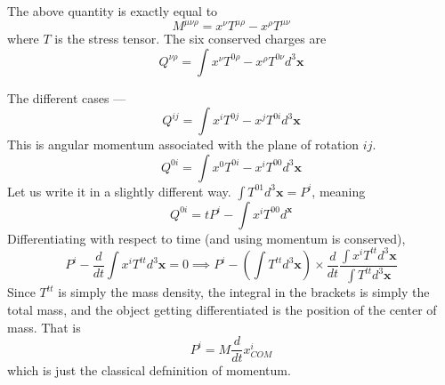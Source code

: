 \documentclass[11pt, notitlepage]{report}
\numberwithin{equation}{section}
\begin{document}
    The above quantity is exactly equal to 
    \begin{equation*}
        M^{\mu\nu\rho} = x^\nu T^{\mu\rho} - x^\rho T^{\mu\nu}
    \end{equation*}
    where \(T\) is the stress tensor. The six conserved charges are 
    \begin{equation*}
        Q^{\nu\rho} = \int  x^\nu T^{0\rho} - x^\rho T^{0\nu} d^3\textbf{x}
    \end{equation*}

    The different cases —\\
    \begin{equation*}
        Q^{ij} = \int  x^i T^{0j} - x^j T^{0i} d^3\textbf{x}
    \end{equation*}
    This is angular momentum associated with the plane of rotation \(ij\).
    \begin{equation*}
        Q^{0i} = \int  x^0 T^{0i} - x^i T^{00} d^3\textbf{x}
    \end{equation*}
    Let us write it in a slightly different way. \(\int T^{01} d^3\textbf{x} = P^i\), meaning 
    \begin{equation*}
        Q^{0i} = tP^i - \int x^i T^{00} d^\textbf{x}
    \end{equation*}
    Differentiating with respect to time (and using momentum is conserved),
    \begin{equation*}
        P^i - \frac{d}{dt} \int x^i T^{tt} d^3\textbf{x} = 0 \implies P^i - \left(\int  T^{tt}d^3\textbf{x} \right)\times \frac{d}{dt} \frac{\int x^i T^{tt} d^3\textbf{x}}{\int  T^{tt} d^3\textbf{x}}
    \end{equation*}
    Since \(T^{tt}\) is simply the mass density, the integral in the brackets is simply the total mass, and the object getting differentiated is the position of the center of mass. That is 
    \begin{equation*}
        P^i = M\frac{d}{dt} x^i_{COM}
    \end{equation*}
    which is just the classical defninition of momentum. 
\end{document}
